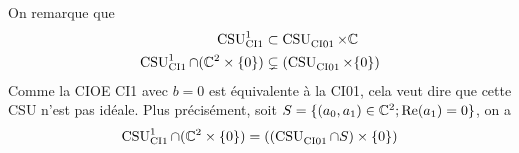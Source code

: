     On remarque que
    \begin{align}
      \CSU[1]{CI1} &\subset \CSU{CI01}\times\CC
      \\
      \CSU[1]{CI1}\cap(\CC^2 \times \lbrace0\rbrace) &\subsetneq (\CSU{CI01}\times\lbrace0\rbrace)
    \end{align}
      Comme la CIOE CI1 avec \(b=0\) est équivalente à la CI01, cela veut dire que cette CSU n'est pas idéale. 
      Plus précisément, soit \(S = \lbrace (a_0,a_1) \in \CC^2; \Re(a_1)=0 \rbrace\), on a
    \begin{equation}
      \CSU[1]{CI1}\cap(\CC^2 \times \lbrace0\rbrace) = ((\CSU{CI01}\cap S) \times\lbrace0\rbrace) 
    \end{equation}


